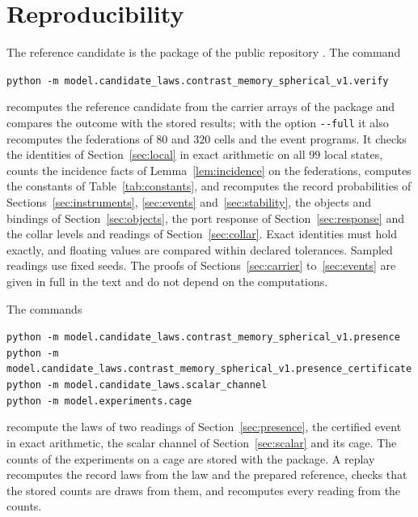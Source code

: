 \documentclass[11pt]{article}
\theoremstyle{definition}
\theoremstyle{remark}
\theoremstyle{plain}
\begin{document}
\section{Reproducibility}
\label{sec:repro}

The reference candidate is the package
 of the public
repository \cite{ophrepo}. The command
\begin{center}
\texttt{python -m model.candidate\_laws.contrast\_memory\_spherical\_v1.verify}
\end{center}
recomputes the reference candidate from the carrier arrays of the package
and compares
the outcome with the stored results; with the option \texttt{-{}-full} it
also recomputes the federations of $80$ and $320$ cells and the event
programs. It checks the identities of Section~\ref{sec:local} in exact
arithmetic on all $99$ local states, counts the incidence facts of
Lemma~\ref{lem:incidence} on the federations, computes the constants of
Table~\ref{tab:constants}, and recomputes the record probabilities of
Sections~\ref{sec:instruments}, \ref{sec:events} and~\ref{sec:stability},
the objects and bindings of Section~\ref{sec:objects}, the port response of
Section~\ref{sec:response} and the collar levels and readings of
Section~\ref{sec:collar}. Exact identities must hold exactly, and floating
values are compared within declared tolerances. Sampled readings use fixed
seeds. The proofs of Sections~\ref{sec:carrier} to~\ref{sec:events} are
given in full in the text and do not depend on the computations.

The commands
\begin{center}
\texttt{python -m model.candidate\_laws.contrast\_memory\_spherical\_v1.presence}\\
\texttt{python -m model.candidate\_laws.contrast\_memory\_spherical\_v1.presence\_certificate}\\
\texttt{python -m model.candidate\_laws.scalar\_channel}\\
\texttt{python -m model.experiments.cage}
\end{center}
recompute the laws of two readings of Section~\ref{sec:presence}, the
certified event in exact arithmetic, the scalar channel of
Section~\ref{sec:scalar} and its cage. The counts of the experiments
on a cage are stored with the package. A replay recomputes the record laws
from the law and the prepared reference, checks that the stored counts are
draws from them, and recomputes every reading from the counts.
\end{document}
